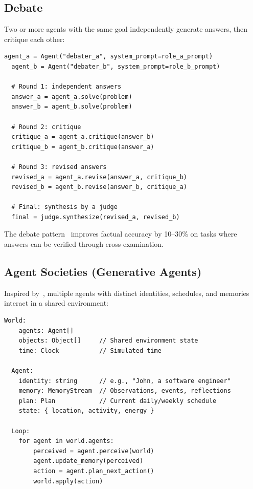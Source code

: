 \subsection{Debate}

Two or more agents with the same goal independently generate answers, then critique each other:

\begin{lstlisting}[caption=Debate pattern]
  agent_a = Agent("debater_a", system_prompt=role_a_prompt)
  agent_b = Agent("debater_b", system_prompt=role_b_prompt)

  # Round 1: independent answers
  answer_a = agent_a.solve(problem)
  answer_b = agent_b.solve(problem)

  # Round 2: critique
  critique_a = agent_a.critique(answer_b)
  critique_b = agent_b.critique(answer_a)

  # Round 3: revised answers
  revised_a = agent_a.revise(answer_a, critique_b)
  revised_b = agent_b.revise(answer_b, critique_a)

  # Final: synthesis by a judge
  final = judge.synthesize(revised_a, revised_b)
\end{lstlisting}

The debate pattern~\cite{li2023camel} improves factual accuracy by 10--30\% on tasks where answers can be verified through cross-examination.

\subsection{Agent Societies (Generative Agents)}

Inspired by~\cite{park2023generative}, multiple agents with distinct identities, schedules, and memories interact in a shared environment:

\begin{lstlisting}[caption=Agent society architecture]
  World:
    agents: Agent[]
    objects: Object[]     // Shared environment state
    time: Clock           // Simulated time

  Agent:
    identity: string      // e.g., "John, a software engineer"
    memory: MemoryStream  // Observations, events, reflections
    plan: Plan            // Current daily/weekly schedule
    state: { location, activity, energy }

  Loop:
    for agent in world.agents:
        perceived = agent.perceive(world)
        agent.update_memory(perceived)
        action = agent.plan_next_action()
        world.apply(action)
\end{lstlisting}

